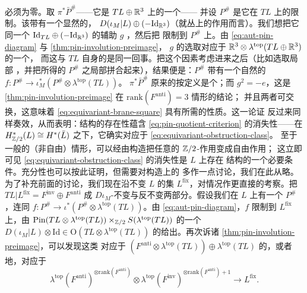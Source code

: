 必须为零。取\trPullback{} $\pi^*\bar{P}^{\#}$——它是 $TL\oplus\mathbb{R}^3$ 上的一个\trPinStructure——
并设 $P^{\#}$ 是它在 $TL$ 上的限制。该\trPullback{}带有一个显然的\trAutomorphism，\trCovering{}
$D(\iota_M|L)\oplus(-\mathrm{Id}_{\mathbb{R}^3})$（就\trFrame{}丛上的作用而言）。我们想把它同一个\trCovering{}
$\mathrm{Id}_{TL}\oplus(-\mathrm{Id}_{\mathbb{R}^3})$ 的辅助\trAutomorphism{} $g$ \trComposition{}，然后把%
\trComposition{}限制到 $P^{\#}$ 上。由 \eqref{eq:aut-pin-diagram} 与 \cref{thm:pin-involution-preimage}，
$g$ 的选取对应于 $\mathbb{R}^3\otimes\lambda^{\mathrm{top}}(TL\oplus\mathbb{R}^3)$ 的一个\trOrientation，
而这与 $TL$ 自身的\trOrientation{}是同一回事。把这个因素考虑进来之后（比如选取局部%
\trOrientation，并把所得的 $P^{\#}$ 之局部\trAutomorphism{}拼合起来），结果便是：$P^{\#}$
带有一个自然的\trAutomorphism{} $f\colon P^{\#}\to\iota_M^*(P^{\#}\otimes\lambda^{\mathrm{top}}(TL))$。
$\pi^*\bar{P}^{\#}$ 原来的\trAutomorphism{}按定义是个\trInvolution；而 $g^2=-e$，这是
\cref{thm:pin-involution-preimage} 在 $\mathrm{rank}(F^{\mathrm{anti}})=3$ 情形的结论；
并且两者可交换，这意味着 \eqref{eq:equivariant-brane-square} 具有所需的性质。这一论证
反过来同样奏效，从而表明：\trEquivariant{}\trBrane{}结构的存在性蕴含 \eqref{eq:pin-quotient-criterion}
的消失性——在 $H^*_{\mathbb{Z}/2}(L)\cong H^*(\bar{L})$ 之下，它确实对应于
\eqref{eq:equivariant-obstruction-class}。
至于一般的（非自由）情形，可以经由\trBorel{}构造把任意的 $\mathbb{Z}/2$-作用变成自由作用；
这立即可见 \eqref{eq:equivariant-obstruction-class} 的消失性是 $L$ 上存在\trEquivariant{}\trBrane{}
结构的一个必要条件。充分性也可以按此证明，但需要对\trBorel{}构造上的\trPinStructure{}
多作一点讨论，我们在此从略。
为了补充前面的讨论，我们现在沿不变\trLagrange\trSubmanifold{} $L$ 的\trFixedPoint{}集
$L^{\mathrm{fix}}$，对情况作更直接的考察。把 $TL|L^{\mathrm{fix}}=F^{\mathrm{inv}}\oplus
F^{\mathrm{anti}}$ \trSplitting{}成 $D\iota_M$-不变与反不变两部分。假设我们在 $L$ 上有一个%
\trPinStructure{} $P^{\#}$，连同\trIsomorphism{} $f\colon P^{\#}\to\iota^*(P^{\#}\otimes
\lambda^{\mathrm{top}}(TL))$。由 \eqref{eq:aut-pin-diagram}，$f$ 限制到 $L^{\mathrm{fix}}$
上，由 $\mathrm{Pin}(TL\otimes\lambda^{\mathrm{top}}(TL))\times_{\mathbb{Z}/2}S(\lambda^{\mathrm{top}}(TL))$
的一个\trCovering{} $D(\iota_M|L)\otimes\mathrm{Id}\in\mathrm{O}(TL\otimes\lambda^{\mathrm{top}}(TL))$
的\trSection{}给出。再次诉诸 \cref{thm:pin-involution-preimage}，可以发现这类\trSection{}
对应于 $(F^{\mathrm{anti}}\otimes\lambda^{\mathrm{top}}(TL))\oplus\lambda^{\mathrm{top}}(TL)$
的\trOrientation，或者\trEquivalence{}地，对应于
\begin{equation}\label{eq:normal-fix-trivialization}
\lambda^{\mathrm{top}}(F^{\mathrm{anti}})^{\otimes\mathrm{rank}(F^{\mathrm{anti}})}
\otimes\lambda^{\mathrm{top}}(F^{\mathrm{inv}})^{\otimes\mathrm{rank}(F^{\mathrm{anti}})+1}
\longrightarrow L^{\mathrm{fix}}.
\end{equation}
